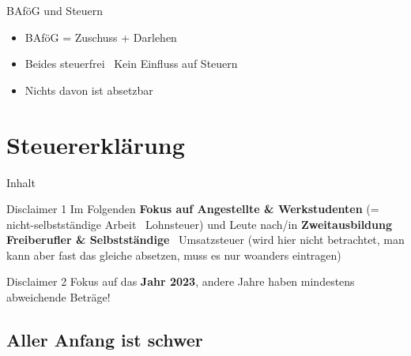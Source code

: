\documentclass{beamer}
\begin{document}
		\begin{frame}{BAföG und Steuern}
			\begin{itemize}
				\item BAföG = Zuschuss + Darlehen
				\item Beides steuerfrei \textrightarrow\ Kein Einfluss auf Steuern
				\item Nichts davon ist absetzbar
			\end{itemize}
		\end{frame}
	
	\section{Steuererklärung}
	
		\begin{frame}[t]{Inhalt}
		\end{frame}
	
		\begin{frame}{Disclaimer 1}
			Im Folgenden \textbf{Fokus auf Angestellte \& Werkstudenten} (= nicht-selbstständige Arbeit \textrightarrow\ Lohnsteuer) und Leute nach/in \textbf{Zweitausbildung}\n\pause
			\textbf{Freiberufler \& Selbstständige} \textrightarrow\ Umsatzsteuer (wird hier nicht betrachtet, man kann aber fast das gleiche absetzen, muss es nur woanders eintragen)
		\end{frame}
		
		\begin{frame}{Disclaimer 2}
			Fokus auf das \textbf{Jahr 2023}, andere Jahre haben mindestens abweichende Beträge!
		\end{frame}
	
		\subsection{Aller Anfang ist schwer}
\end{document}
